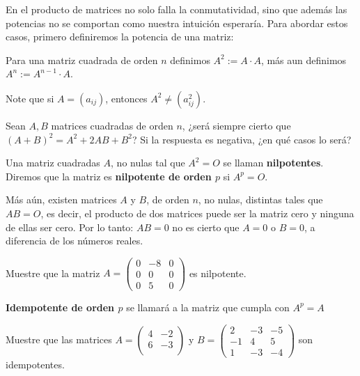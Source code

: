 En el producto de matrices no solo falla la conmutatividad, sino que adem\'as las potencias no se comportan como nuestra intuici\'on esperar\'ia. Para abordar estos casos, primero definiremos la potencia de una matriz:

\begin{defin}
Para una matriz cuadrada de orden $n$ definimos $A^2:=A\cdot A$, m\'as aun definimos $A^n:=A^{n-1}\cdot A$.
\end{defin}

\begin{rmk}
Note que si $A=(a_{ij})$, entonces $A^2\neq(a_{ij}^2).$
\end{rmk}
\begin{ejer}
    Sean $A, B$ matrices cuadradas de  orden $n$, ¿ser\'a siempre cierto que  $(A+B)^2=A^2+2AB+B^2$? Si la respuesta es negativa, ¿en qu\'e casos lo ser\'a?
\end{ejer}

\begin{defin}
Una matriz cuadradas $A$, no nulas tal que $A^2 = O$ se llaman \textbf{nilpotentes}. Diremos que la matriz es \textbf{nilpotente de orden $p$} si $ A^p= O$.
\end{defin}
Más aún, existen matrices $A$ y $B$, de orden $n$, no nulas, distintas tales que $AB = O$, es decir, el producto
de dos matrices puede ser la matriz cero y ninguna de ellas ser cero.
Por lo tanto: $AB = 0$ no es cierto que $A = 0 $ o $ B = 0$, a diferencia de los n\'umeros reales.

\begin{ejer}
    Muestre que la matriz $A=\begin{pmatrix}
    0 & -8 &0\\
    0 & 0  &0\\
    0& 5&0
    \end{pmatrix}$ es nilpotente.
\end{ejer}

\begin{defin}
\textbf{Idempotente de orden $p$} se llamará a la matriz que cumpla con $A^p = A$
\end{defin}

\begin{ejer}
    Muestre que las matrices $A=\begin{pmatrix}
    4 & -2 \\
    6 & -3  \\
    \end{pmatrix}$ y $B=\begin{pmatrix}
    2 & -3 &-5\\
    -1 & 4  &5\\
    1& -3&-4
    \end{pmatrix}$ son idempotentes.
\end{ejer}

